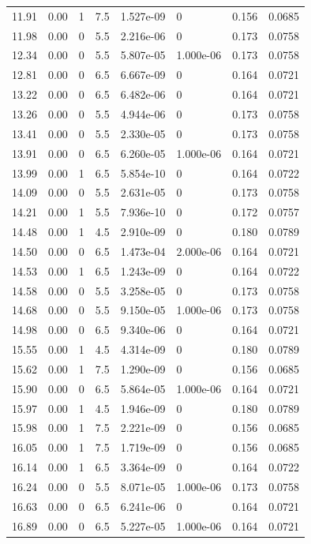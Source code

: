 \documentclass[preview]{standalone}
\begin{document}
{{{\begin{tabular}{L{1.2cm}C{1.2cm} C{0.3cm}C{0.5cm} C{1.4cm}C{1.4cm} C{1.4cm}C{1.4cm}}
  11.91  &  0.00  & 1     & 7.5 &  1.527e-09  & 0  & 0.156 &  0.0685   \\ 
  11.98  &  0.00  & 0     & 5.5 &  2.216e-06  & 0  & 0.173 &  0.0758   \\ 
  12.34  &  0.00  & 0     & 5.5 &  5.807e-05  & 1.000e-06  & 0.173 &  0.0758   \\ 
  12.81  &  0.00  & 0     & 6.5 &  6.667e-09  & 0  & 0.164 &  0.0721   \\ 
  13.22  &  0.00  & 0     & 6.5 &  6.482e-06  & 0  & 0.164 &  0.0721   \\ 
  13.26  &  0.00  & 0     & 5.5 &  4.944e-06  & 0  & 0.173 &  0.0758   \\ 
  13.41  &  0.00  & 0     & 5.5 &  2.330e-05  & 0  & 0.173 &  0.0758   \\ 
  13.91  &  0.00  & 0     & 6.5 &  6.260e-05  & 1.000e-06  & 0.164 &  0.0721   \\ 
  13.99  &  0.00  & 1     & 6.5 &  5.854e-10  & 0  & 0.164 &  0.0722   \\ 
  14.09  &  0.00  & 0     & 5.5 &  2.631e-05  & 0  & 0.173 &  0.0758   \\ 
  14.21  &  0.00  & 1     & 5.5 &  7.936e-10  & 0  & 0.172 &  0.0757   \\ 
  14.48  &  0.00  & 1     & 4.5 &  2.910e-09  & 0  & 0.180 &  0.0789   \\ 
  14.50  &  0.00  & 0     & 6.5 &  1.473e-04  & 2.000e-06  & 0.164 &  0.0721   \\ 
  14.53  &  0.00  & 1     & 6.5 &  1.243e-09  & 0  & 0.164 &  0.0722   \\ 
  14.58  &  0.00  & 0     & 5.5 &  3.258e-05  & 0  & 0.173 &  0.0758   \\ 
  14.68  &  0.00  & 0     & 5.5 &  9.150e-05  & 1.000e-06  & 0.173 &  0.0758   \\ 
  14.98  &  0.00  & 0     & 6.5 &  9.340e-06  & 0  & 0.164 &  0.0721   \\ 
  15.55  &  0.00  & 1     & 4.5 &  4.314e-09  & 0  & 0.180 &  0.0789   \\ 
  15.62  &  0.00  & 1     & 7.5 &  1.290e-09  & 0  & 0.156 &  0.0685   \\ 
  15.90  &  0.00  & 0     & 6.5 &  5.864e-05  & 1.000e-06  & 0.164 &  0.0721   \\ 
  15.97  &  0.00  & 1     & 4.5 &  1.946e-09  & 0  & 0.180 &  0.0789   \\ 
  15.98  &  0.00  & 1     & 7.5 &  2.221e-09  & 0  & 0.156 &  0.0685   \\ 
  16.05  &  0.00  & 1     & 7.5 &  1.719e-09  & 0  & 0.156 &  0.0685   \\ 
  16.14  &  0.00  & 1     & 6.5 &  3.364e-09  & 0  & 0.164 &  0.0722   \\ 
  16.24  &  0.00  & 0     & 5.5 &  8.071e-05  & 1.000e-06  & 0.173 &  0.0758   \\ 
  16.63  &  0.00  & 0     & 6.5 &  6.241e-06  & 0  & 0.164 &  0.0721   \\ 
  16.89  &  0.00  & 0     & 6.5 &  5.227e-05  & 1.000e-06  & 0.164 &  0.0721   \\ 
\hline 
\end{tabular} 

}}}
\end{document}
